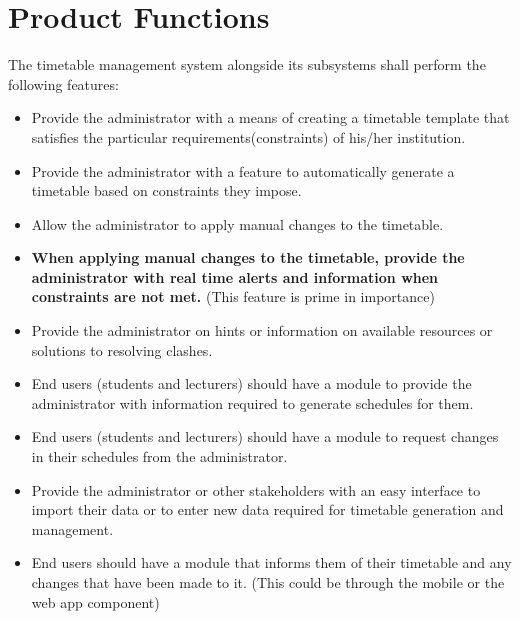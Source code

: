 \documentclass{scrreprt}
\begin{document}

\section{Product Functions}
The timetable management system alongside its subsystems shall perform the following features:

\begin{itemize}
 \item Provide the administrator with a means of creating a timetable template that satisfies the particular requirements(constraints) of his/her institution.
 \item Provide the administrator with a feature to automatically generate a timetable based on constraints they impose.
 \item Allow the administrator to apply manual changes to the timetable.
 \item \textbf{ When applying manual changes to the timetable, provide the administrator with real time alerts and information when constraints are not met.} (This feature is prime in importance)
 \item Provide the administrator on hints or information on available resources or solutions to resolving clashes.
 \item End users (students and lecturers) should have a module to provide the administrator with information required to generate schedules for them.
 \item End users (students and lecturers) should have a module to request changes in their schedules from the administrator.
 \item Provide the administrator or other stakeholders with an easy interface to import their data or to enter new data required for timetable generation and management.
 \item End users should have a module that informs them of their timetable and any changes that have been made to it. (This could be through the mobile or the web app component)
\end{itemize}
\end{document}
